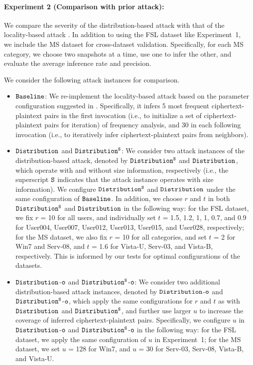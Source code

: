 \documentclass[bachelor]{thesis-uestc}
\begin{document}
\paragraph{Experiment 2 (Comparison with prior attack):}
We compare the severity of the distribution-based attack with that of the
locality-based attack \cite{li17}. In addition to using the FSL dataset like
Experiment~1, we include the MS dataset for cross-dataset validation.
Specifically, for each MS category, we choose two snapshots at a time, use one
to infer the other, and evaluate the average inference rate and precision. 

We consider the following attack instances for comparison. 
%
\begin{itemize}[leftmargin=*]
\item 
$\tt Baseline$: We re-implement the locality-based attack based on the
parameter configuration suggested in \cite{li17}. Specifically, it infers 5
most frequent ciphertext-plaintext pairs in the first invocation (i.e., to
initialize a set of ciphertext-plaintext pairs for iteration) of frequency
analysis, and 30 in each following invocation (i.e., to iteratively infer ciphertext-plaintext pairs from 
 neighbors).  
\item 
$\tt Distribution$ and $\tt Distribution^S$: We consider two attack instances
of the distribution-based attack, denoted by $\tt Distribution^S$ and ${\tt
Distribution}$, which operate with and without size information,
        respectively (i.e., the superscript $\tt S$ indicates that the attack instance operates with size information). 
        We configure $\tt Distribution^S$ and ${\tt Distribution}$
under the same configuration of  ${\tt Baseline}$. In addition, we choose
$r$ and $t$ in both  $\tt Distribution^S$ and ${\tt Distribution}$ in the following way: for the FSL dataset, we fix $r$ = 10 for
all users, and individually set $t$ = 1.5, 1.2, 1, 1, 0.7, and 0.9 for
User004, User007, User012, User013, User015, and User028, respectively; for
the MS dataset, we also fix $r$ = 10 for all categories, and set $t$ = 2 for
Win7 and Serv-08, and $t$ = 1.6 for Vista-U, Serv-03, and Vista-B, respectively.
This is informed by our tests for optimal configurations of the datasets.   
\item 
$\tt Distribution$-$\tt o$ and $\tt Distribution^S$-$\tt o$:
We consider two additional distribution-based attack instances, denoted by $\tt Distribution$-$\tt o$
and $\tt Distribution^S$-$\tt o$, which apply the same configurations for $r$ and $t$ as with $\tt Distribution$ and $\tt
Distribution^S$, and further use larger $u$ to increase the
coverage of inferred ciphertext-plaintext pairs.  
        Specifically, we configure $u$ in $\tt Distribution$-$\tt o$
and $\tt Distribution^S$-$\tt o$ in the following way:  
        for the FSL
dataset, we apply the same configuration of $u$ in Experiment~1; for the MS
dataset, we set $u$ = 128 for Win7, and $u$ = 30 for Serv-03, Serv-08,
Vista-B, and Vista-U. 
\end{itemize}
\end{document}
